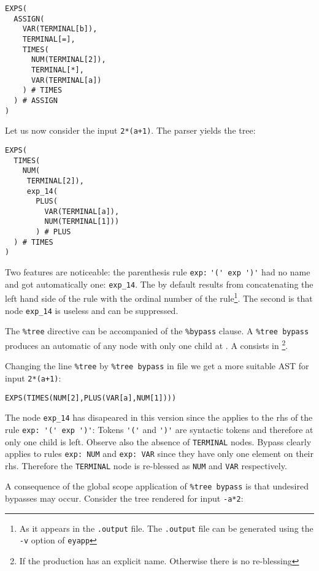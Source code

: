 \begin{verbatim}
EXPS(
  ASSIGN(
    VAR(TERMINAL[b]),
    TERMINAL[=],
    TIMES(
      NUM(TERMINAL[2]),
      TERMINAL[*],
      VAR(TERMINAL[a])
    ) # TIMES
  ) # ASSIGN
)
\end{verbatim}
Let us now consider the input \verb|2*(a+1)|.
The parser yields the tree:
\begin{verbatim}
EXPS(
  TIMES(
    NUM(
     TERMINAL[2]),
     exp_14(
       PLUS(
         VAR(TERMINAL[a]),
         NUM(TERMINAL[1]))
       ) # PLUS
  ) # TIMES
)
\end{verbatim}
Two features are noticeable: the parenthesis rule \verb|exp:| \verb|'(' exp ')'|
had no name
and got automatically one: \verb|exp_14|. The  by 
default results from concatenating the left hand side of the rule
with the ordinal number of the rule\footnote{As it appears
in the {\tt .output} file. The {\tt .output} file can be generated 
using the {\tt -v} option of {\tt eyapp}}.
The second is that node \verb|exp_14| is useless and can be suppressed. 

The \verb|%tree| directive can be accompanied of the \verb|%bypass|
clause.  A \verb|%tree bypass| produces an automatic  of any
node with only one child at . 
A  consists in \footnote{If the production has an
explicit name. Otherwise there is no re-blessing}. 

Changing the line \verb|%tree| by \verb|%tree bypass|
in file  we get a more suitable 
AST for input \verb|2*(a+1)|:
 
\begin{verbatim}
EXPS(TIMES(NUM[2],PLUS(VAR[a],NUM[1])))
\end{verbatim}

The node \verb|exp_14| has disapeared in this version
since the  applies to the rhs 
of the rule \verb|exp: '(' exp ')'|:
Tokens \verb|'('| and \verb|')'| are syntactic tokens
and therefore at 
only one child is left. Observe also the absence 
of \verb|TERMINAL| nodes. Bypass clearly applies
to rules \verb|exp: NUM| and \verb|exp: VAR| since
they have only one element on their rhs. Therefore the
\verb|TERMINAL| node is re-blessed as \verb|NUM| and
\verb|VAR| respectively.


A consequence of the global scope application of \verb|%tree bypass|
is that undesired bypasses may occur. Consider the tree 
rendered for input \verb|-a*2|:

